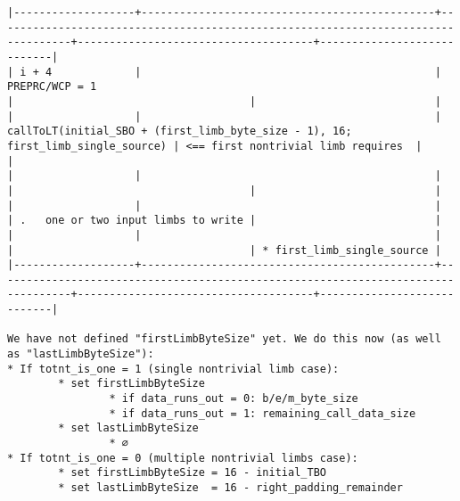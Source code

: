 \documentclass[varwidth=\maxdimen,margin=0.5cm,multi={verbatim}]{standalone}
\begin{document}
\begin{verbatim}
|-------------------+----------------------------------------------+----------------------------------------------------------------------------------+-------------------------------------+----------------------------|
| i + 4             |                                              | PREPRC/WCP = 1                                                                   |                                     |                            |
|                   |                                              | callToLT(initial_SBO + (first_limb_byte_size - 1), 16; first_limb_single_source) | <== first nontrivial limb requires  |                            |
|                   |                                              |                                                                                  |                                     |                            |
|                   |                                              |                                                                                  | .   one or two input limbs to write |                            |
|                   |                                              |                                                                                  |                                     | * first_limb_single_source |
|-------------------+----------------------------------------------+----------------------------------------------------------------------------------+-------------------------------------+----------------------------|

We have not defined "firstLimbByteSize" yet. We do this now (as well as "lastLimbByteSize"):
* If totnt_is_one = 1 (single nontrivial limb case):
        * set firstLimbByteSize
                * if data_runs_out = 0: b/e/m_byte_size
                * if data_runs_out = 1: remaining_call_data_size
        * set lastLimbByteSize
                * ∅
* If totnt_is_one = 0 (multiple nontrivial limbs case):
        * set firstLimbByteSize = 16 - initial_TBO
        * set lastLimbByteSize  = 16 - right_padding_remainder


\end{verbatim}
\end{document}
